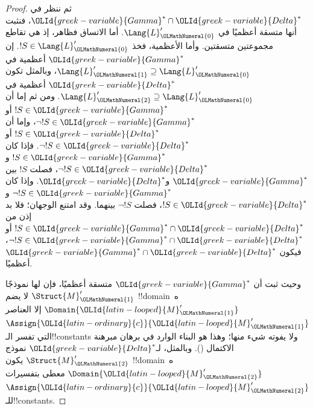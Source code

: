 \documentclass[../../../include/open-logic-section]{subfiles}
\begin{document}
\begin{proof}
ثم ننظر في $\OLId{greek-variable}{Gamma}^* \cap \OLId{greek-variable}{Delta}^*$، فنثبت أنها متسقة أعظميًا في
$\Lang{L}'_\OLMathNumeral{0}$. أما الاتساق فظاهر، إذ هي تقاطع مجموعتين متسقتين. وأما
الأعظمية، فخذ $!S \in \Lang{L}'_\OLMathNumeral{0}$. إن $\OLId{greek-variable}{Gamma}^*$ أعظمية في
$\Lang{L}'_\OLMathNumeral{1} \supseteq \Lang{L}'_\OLMathNumeral{0}$، وبالمثل تكون $\OLId{greek-variable}{Delta}^*$ أعظمية
في $\Lang{L}'_\OLMathNumeral{2} \supseteq \Lang{L}'_\OLMathNumeral{0}$. ومن ثم إما أن
$!S \in \OLId{greek-variable}{Gamma}^*$ أو $\lnot !S \in \OLId{greek-variable}{Gamma}^*$، وإما أن
$!S \in \OLId{greek-variable}{Delta}^*$ أو $\lnot !S \in \OLId{greek-variable}{Delta}^*$. فإذا كان
$!S \in \OLId{greek-variable}{Gamma}^*$ و$\lnot !S \in \OLId{greek-variable}{Delta}^*$، فصلت $!S$ بين
$\OLId{greek-variable}{Gamma}^*$ و$\OLId{greek-variable}{Delta}^*$. وإذا كان $\lnot !S \in \OLId{greek-variable}{Gamma}^*$ و
$!S \in \OLId{greek-variable}{Delta}^*$، فصلت $\lnot !S$ بينهما. وقد امتنع الوجهان؛ فلا بد إذن من
$!S \in \OLId{greek-variable}{Gamma}^* \cap \OLId{greek-variable}{Delta}^*$ أو
$\lnot !S \in \OLId{greek-variable}{Gamma}^* \cap \OLId{greek-variable}{Delta}^*$، فيكون
$\OLId{greek-variable}{Gamma}^* \cap \OLId{greek-variable}{Delta}^*$ أعظميًا.

وحيث ثبت أن $\OLId{greek-variable}{Gamma}^*$ متسقة أعظميًا، فإن لها نموذجًا $\Struct{M}'_\OLMathNumeral{1}$ لا يضم
!!{domain}ه~$\Domain{\OLId{latin-looped}{M}'_\OLMathNumeral{1}}$ إلا العناصر $\Assign{\OLId{latin-ordinary}{c}}{\OLId{latin-looped}{M}'_\OLMathNumeral{1}}$ التي تفسر
الـ!!{constant}s ولا يفوته شيء منها؛ وهذا هو البناء الوارد في برهان مبرهنة الاكتمال
(). وبالمثل، لـ$\OLId{greek-variable}{Delta}^*$ نموذج
$\Struct{M}'_\OLMathNumeral{2}$ يكون !!{domain}ه~$\Domain{\OLId{latin-looped}{M}'_\OLMathNumeral{2}}$ معطى بتفسيرات
$\Assign{\OLId{latin-ordinary}{c}}{\OLId{latin-looped}{M}'_\OLMathNumeral{2}}$ للـ!!{constant}s.


\end{proof}
\end{document}
